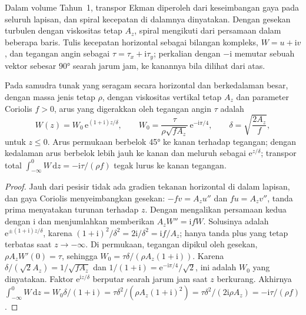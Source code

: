 Dalam volume Tahun~1, transpor Ekman diperoleh dari keseimbangan gaya
pada seluruh lapisan, dan spiral kecepatan di dalamnya dinyatakan. Dengan
gesekan turbulen dengan viskositas  tetap $A_z$, spiral
mengikuti dari persamaan dalam beberapa baris. Tulis kecepatan horizontal sebagai
bilangan kompleks, $W = u + \mathrm iv$, dan tegangan angin sebagai $\tau =
\tau_x + \mathrm i\tau_y$; perkalian dengan $-\mathrm i$ memutar sebuah vektor
sebesar \ang{90} searah jarum jam, ke kanannya bila dilihat dari atas.

\begin{theorem}\label{thm:b3:ocean-dynamics:ekman}
Pada samudra tunak yang seragam secara horizontal dan berkedalaman besar, dengan massa jenis
tetap $\rho$, dengan viskositas  vertikal tetap $A_z$ dan parameter Coriolis
$f > 0$, arus yang digerakkan oleh tegangan angin $\tau$ adalah
\[
W(z) = W_0\,\mathrm e^{(1+\mathrm i)z/\delta},\qquad
W_0 = \frac{\tau}{\rho\sqrt{fA_z}}\,\mathrm e^{-\mathrm i\pi/4},\qquad
\delta = \sqrt{\frac{2A_z}{f}} ,
\]
untuk $z \le 0$. Arus permukaan berbelok \ang{45} ke kanan terhadap
tegangan; dengan kedalaman arus berbelok lebih jauh ke kanan dan meluruh sebagai $\mathrm
e^{z/\delta}$; transpor total $\int_{-\infty}^0 W\,\mathrm dz =
-\mathrm i\tau/(\rho f)$ tegak lurus ke kanan tegangan.
\end{theorem}

\begin{proof}
Jauh dari pesisir tidak ada gradien tekanan horizontal di dalam lapisan,
dan gaya Coriolis menyeimbangkan gesekan: $-fv = A_z u''$ dan $fu =
A_z v''$, tanda prima menyatakan turunan terhadap $z$. Dengan mengalikan persamaan kedua dengan
$\mathrm i$ dan menjumlahkan memberikan $A_zW'' = \mathrm ifW$. Solusinya
adalah $\mathrm e^{\pm(1+\mathrm i)z/\delta}$, karena $(1+\mathrm i)^2/\delta^2 =
2\mathrm i/\delta^2 = \mathrm if/A_z$; hanya tanda plus yang tetap terbatas saat
$z \to -\infty$. Di permukaan, tegangan dipikul oleh gesekan,
$\rho A_zW'(0) = \tau$, sehingga $W_0 = \tau\delta/(\rho A_z(1+\mathrm i))$.
Karena $\delta/(\sqrt2 A_z) = 1/\sqrt{fA_z}$ dan $1/(1+\mathrm i) = \mathrm
e^{-\mathrm i\pi/4}/\sqrt2$, ini adalah $W_0$ yang dinyatakan. Faktor
$\mathrm e^{\mathrm iz/\delta}$ berputar searah jarum jam saat $z$ berkurang. Akhirnya
$\int_{-\infty}^0 W\,\mathrm dz = W_0\delta/(1+\mathrm i) =
\tau\delta^2/(\rho A_z(1+\mathrm i)^2) = \tau\delta^2/(2\mathrm i\rho A_z)
= -\mathrm i\tau/(\rho f)$.
\end{proof}

